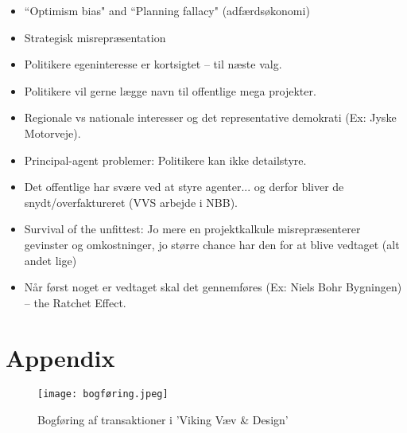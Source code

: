 \documentclass[10pt,reqno, usenames]{article}
\begin{document}
\begin{itemize}
    \item ``Optimism bias" and ``Planning fallacy" (adfærdsøkonomi)
    \item Strategisk misrepræsentation
    \item Politikere egeninteresse er kortsigtet – til næste valg.
    \item Politikere vil gerne lægge navn til offentlige mega projekter.
    \item Regionale vs nationale interesser og det representative demokrati (Ex: Jyske Motorveje).
    \item Principal-agent problemer: Politikere kan ikke detailstyre.
    \item Det offentlige har svære ved at styre agenter... og derfor bliver de snydt/overfaktureret (VVS arbejde i NBB).
        \item Survival of the unfittest: Jo mere en projektkalkule misrepræsenterer gevinster og omkostninger, jo større chance har den for at blive vedtaget (alt andet lige)
        \item Når først noget er vedtaget skal det gennemføres (Ex: Niels Bohr Bygningen) – the Ratchet Effect.
\end{itemize}



















\newpage
\section{Appendix}

\begin{figure}[h]
     \centering
     \texttt{[image: bogføring.jpeg]}
     \caption{Bogføring af transaktioner i 'Viking Væv \& Design'}
     \label{Figur 2}
\end{figure} 
\end{document}
